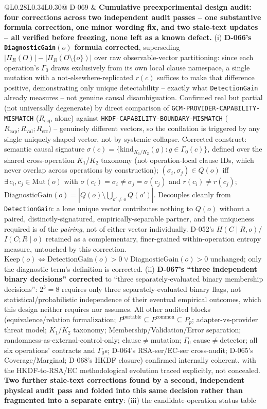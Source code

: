 \documentclass[11pt,a4paper]{article}
\begin{document}
\begin{longtable}{@{}L{0.28\textwidth}L{0.34\textwidth}L{0.30\textwidth}@{}}
D-069 & \textbf{Cumulative preexperimental design audit: four corrections across two independent audit passes -- one substantive formula correction, one minor wording fix, and two stale-text updates -- all verified before freezing, none left as a known defect.} (i) \textbf{D-066's \texttt{DiagnosticGain}$(o)$ formula corrected}, superseding $|\Pi_R(O)|-|\Pi_R(O\setminus\{o\})|$ over raw observable-vector partitioning: since each operation's $\Gamma_0$ draws exclusively from its own local clause namespace, a single mutation with a not-elsewhere-replicated $r(c)$ suffices to make that difference positive, demonstrating only unique detectability -- exactly what \texttt{DetectionGain} already measures -- not genuine causal disambiguation. Confirmed real but partial (not universally degenerate) by direct comparison of \texttt{GCM-PROVIDER-CAPABILITY-MISMATCH} ($R_{\text{cap}}$ alone) against \texttt{HKDF-CAPABILITY-BOUNDARY-MISMATCH} ($R_{\text{cap}};R_{\text{val}};R_{\text{err}}$) -- genuinely different vectors, so the conflation is triggered by any single uniquely-shaped vector, not by systemic collapse. Corrected construct: semantic causal signature $\sigma(c)=\{\text{kind}_{K_1/K_2}(g):g\in\Gamma_0(c)\}$, defined over the shared cross-operation $K_1$/$K_2$ taxonomy (not operation-local clause IDs, which never overlap across operations by construction); $(\sigma_i,\sigma_j)\in Q(o)$ iff $\exists\,c_i,c_j\in\text{Mut}(o)$ with $\sigma(c_i)=\sigma_i\neq\sigma_j=\sigma(c_j)$ and $r(c_i)\neq r(c_j)$; $\text{DiagnosticGain}(o)=|Q(o)\setminus\bigcup_{o'\neq o}Q(o')|$. Decouples cleanly from \texttt{DetectionGain}: a lone unique vector contributes nothing to $Q(o)$ without a paired, distinctly-signatured, empirically-separable partner, and the uniqueness required is of the \emph{pairing}, not of either vector individually. D-052's $H(C\mid R,o)$/$I(C;R\mid o)$ retained as a complementary, finer-grained within-operation entropy measure, untouched by this correction. $\text{Keep}(o)\iff\text{DetectionGain}(o)>0\vee\text{DiagnosticGain}(o)>0$ unchanged; only the diagnostic term's definition is corrected. (ii) \textbf{D-067's ``three independent binary decisions'' corrected} to ``three separately-evaluated binary membership decisions'': $2^3=8$ requires only three separately-evaluated binary flags, not statistical/probabilistic independence of their eventual empirical outcomes, which this design neither requires nor assumes. All other audited blocks (equivalence/relation formalization; $P^{\text{portable}}\subseteq P^{\text{common}}\subseteq P_p$; adapter-vs-provider threat model; $K_1$/$K_2$ taxonomy; Membership/Validation/Error separation; randomness-as-external-control-only; clause$\neq$mutation; $\Gamma_0$ cause$\neq$detector; all six operations' contracts and $\Gamma_0$s; D-064's RSA-ser/EC-ser cross-audit; D-065's Coverage/Marginal; D-068's HKDF closure) confirmed internally coherent, with the HKDF-to-RSA/EC methodological evolution traced explicitly, not concealed. \textbf{Two further stale-text corrections found by a second, independent physical audit pass and folded into this same decision rather than fragmented into a separate entry}: (iii) the candidate-operation status table 
\end{longtable}
\end{document}
